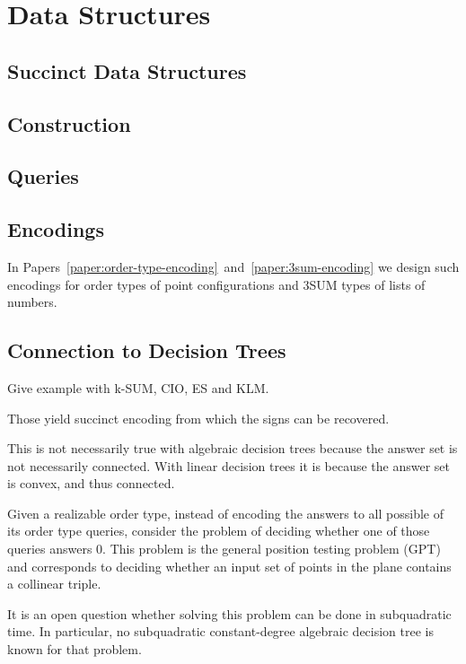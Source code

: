 \section{Data Structures}

\subsection{Succinct Data Structures}

\subsection{Construction}

\subsection{Queries}

\subsection{Encodings}



In Papers~\ref{paper:order-type-encoding}~and~\ref{paper:3sum-encoding} we
design such encodings for order types of point configurations and 3SUM types of
lists of numbers.

\subsection{Connection to Decision Trees}

Give example with k-SUM, CIO, ES and KLM.

Those yield succinct encoding from which the signs can be recovered.

This is not necessarily true with algebraic decision trees because the answer
set is not necessarily connected. With linear decision trees it is because the
answer set is convex, and thus connected.

Given a realizable order type, instead of encoding the answers to all possible
of its order type queries, consider the problem of deciding whether one of
those queries answers \(0\).
This problem is the general position testing problem (GPT) and corresponds to
deciding whether an input set of points in the plane contains a collinear
triple.

It is an open question whether solving this problem can be done in subquadratic
time. In particular, no subquadratic constant-degree algebraic decision tree is
known for that problem.

